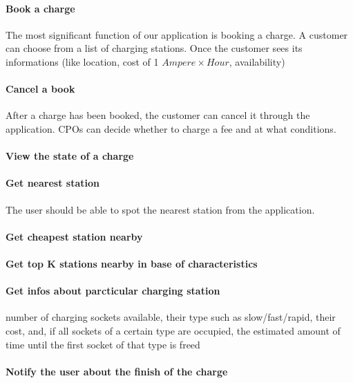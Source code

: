 \paragraph{Book a charge}
The most significant function of our application is booking a charge. A customer can choose from a list of charging stations. Once the customer sees its informations (like location, cost of 1 $Ampere \times Hour$, availability)

\paragraph{Cancel a book}
After a charge has been booked, the customer can cancel it through the application. \acp{CPO} can decide whether to charge a fee and at what conditions.

\paragraph{View the state of a charge}

\paragraph{Get nearest station}
The user should be able to spot the nearest station from the application.

\paragraph{Get cheapest station nearby}

\paragraph{Get top K stations nearby in base of characteristics}
\paragraph{Get infos about parcticular charging station}
number of charging sockets available, their type such as slow/fast/rapid, their cost, and, if all sockets of a certain type are occupied, the estimated amount of time until the first socket of that type is freed

\paragraph{Notify the user about the finish of the charge}

